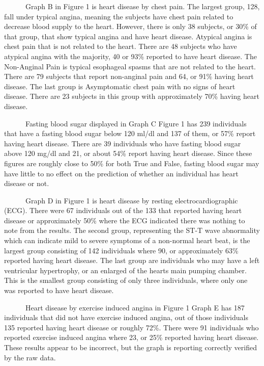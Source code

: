 \documentclass[
]{article}
\begin{document}
~~~~~~Graph B in Figure 1 is heart disease by chest pain. The largest
group, 128, fall under typical angina, meaning the subjects have chest
pain related to decrease blood supply to the heart. However, there is
only 38 subjects, or 30\% of that group, that show typical angina and
have heart disease. Atypical angina is chest pain that is not related to
the heart. There are 48 subjects who have atypical angina with the
majority, 40 or 93\% reported to have heart disease. The Non-Anginal
Pain is typical esophageal spasms that are not related to the heart.
There are 79 subjects that report non-anginal pain and 64, or 91\%
having heart disease. The last group is Asymptomatic chest pain with no
signs of heart disease. There are 23 subjects in this group with
approximately 70\% having heart disease.

~~~~~~Fasting blood sugar displayed in Graph C Figure 1 has 239
individuals that have a fasting blood sugar below 120 ml/dl and 137 of
them, or 57\% report having heart disease. There are 39 individuals who
have fasting blood sugar above 120 mg/dl and 21, or about 54\% report
having heart disease. Since these figures are roughly close to 50\% for
both True and False, fasting blood sugar may have little to no effect on
the prediction of whether an individual has heart disease or not.

~~~~~~Graph D in Figure 1 is heart disease by resting
electrocardiographic (ECG). There were 67 individuals out of the 133
that reported having heart disease or approximately 50\% where the ECG
indicated there was nothing to note from the results. The second group,
representing the ST-T wave abnormality which can indicate mild to severe
symptoms of a non-normal heart beat, is the largest group consisting of
142 individuals where 90, or approximately 63\% reported having heart
disease. The last group are individuals who may have a left ventricular
hypertrophy, or an enlarged of the hearts main pumping chamber. This is
the smallest group consisting of only three individuals, where only one
was reported to have heart disease.

~~~~~~Heart disease by exercise induced angina in Figure 1 Graph E has
187 individuals that did not have exercise induced angina, out of those
individuals 135 reported having heart disease or roughly 72\%. There
were 91 individuals who reported exercise induced angina where 23, or
25\% reported having heart disease. These results appear to be
incorrect, but the graph is reporting correctly verified by the raw
data.
\end{document}
